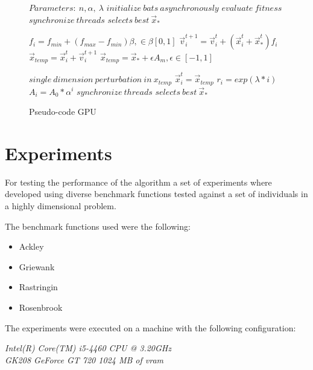 \documentclass[conference]{IEEEtran}
\begin{document}
\begin{figure}
\begin{algorithmic}[1]
\State $Parameters:\ n,\alpha,\ \lambda$
\State $initialize\ bats\ asynchronously$
\State $evaluate\ fitness$
\State $synchronize\ threads$
\State $selects\ best\ \vec{x}_*$

        \State $f_i=f_{min} + (f_{max} - f_{min})\beta, \in \beta [0,1]$
        \State $\vec{v}_i^{t+1} = \vec{v}_i^{t} + (\vec{x}_i^{t} + \vec{x}_*^{t})f_i$
        \State $\vec{x}_{temp} = \vec{x}_i^{t} + \vec{v}_i^{t+1}$
            \State $\vec{x}_{temp} = \vec{x}_* + \epsilon A_m, \epsilon \in [-1, 1]$
        \EndIf

        \State $single\ dimension\ perturbation\ in\ x_{temp}$
            \State $\vec{x}_i^t = \vec{x}_{temp}$
            \State $r_i = exp(\lambda * i)$
            \State $A_i =  A_{0} * \alpha^i$
        \EndIf
        \State $synchronize\ threads$
        \State $selects\ best\ \vec{x}_*$
    \EndFor
\EndWhile
\end{algorithmic}
\caption{Pseudo-code GPU}\label{GPU}
\end{figure}

\section{Experiments}

For testing the performance of the algorithm a set of experiments where
developed using diverse benchmark functions tested against a set of
individuals in a highly dimensional problem.

The benchmark functions used were the following:

\begin{itemize}
    \item Ackley
    \item Griewank
    \item Rastringin
    \item Rosenbrook
\end{itemize}

The experiments were executed on a machine with the following configuration:

\textit{Intel(R) Core(TM) i5-4460  CPU @ 3.20GHz \\ GK208 GeForce GT 720 1024 MB of vram}
\end{document}

